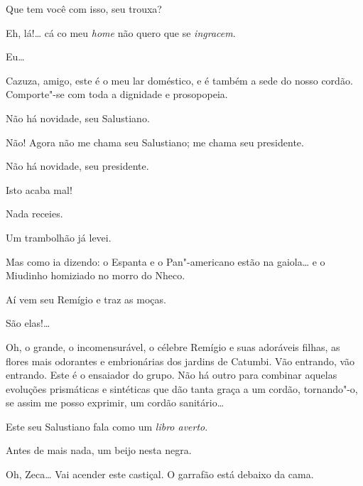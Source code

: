    Que tem você com isso,
seu trouxa?

 Eh, lá!\ldots{} cá co meu \textit{home} não quero que se
\textit{ingracem}.

 Eu\ldots{}

 Cazuza, amigo, este é o meu lar doméstico, e é 
também a sede do nosso cordão. Comporte"-se com toda a dignidade e prosopopeia.

 Não há novidade, seu Salustiano.

 Não! Agora não me chama seu Salustiano; me chama seu
presidente.

 Não há novidade, seu presidente.

   Isto acaba mal!

 Nada receies.

 Um trambolhão já levei.

 Mas como ia dizendo: o Espanta e o Pan"-americano estão na
gaiola\ldots{} e o Miudinho homiziado no morro do Nheco.

  Aí vem seu Remígio e traz as moças.

 São elas!\ldots{}



  Oh, o grande, o
incomensurável, o célebre Remígio e suas adoráveis filhas, as flores mais
odorantes e embrionárias dos jardins de Catumbi. Vão entrando, vão entrando.
  Este é o
ensaiador do grupo. Não há outro para combinar aquelas evoluções prismáticas e
sintéticas que dão tanta graça a um cordão, tornando"-o, se assim me posso
exprimir, um cordão sanitário\ldots{} 

 Este seu Salustiano fala como um \textit{libro averto}.

 Antes de mais nada, um beijo nesta negra. 

 Oh, Zeca\ldots{} Vai acender este castiçal. O garrafão está
debaixo da cama. 

